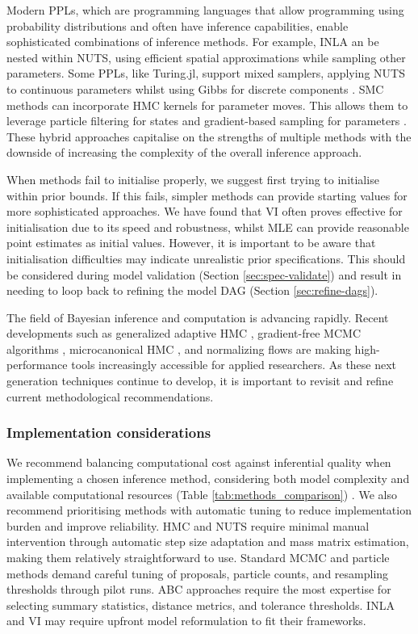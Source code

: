 \documentclass{article}
\begin{document}
Modern \ac{PPL}s, which are programming languages that allow programming using probability distributions and often have inference capabilities, enable sophisticated combinations of inference methods.
For example, \ac{INLA} an be nested within \ac{NUTS}, using efficient spatial approximations while sampling other parameters.
Some \ac{PPL}s, like Turing.jl, support mixed samplers, applying \ac{NUTS} to continuous parameters whilst using Gibbs for discrete components \citet{fjelde2025turing}.
\ac{SMC} methods can incorporate \ac{HMC} kernels for parameter moves.
This allows them to leverage particle filtering for states and gradient-based sampling for parameters \citet{buchholz2021adaptive, devlin2024no, rosato2024enhanced}.
These hybrid approaches capitalise on the strengths of multiple methods with the downside of increasing the complexity of the overall inference approach.

When methods fail to initialise properly, we suggest first trying to initialise within prior bounds.
If this fails, simpler methods can provide starting values for more sophisticated approaches.
We have found that \ac{VI} often proves effective for initialisation due to its speed and robustness, whilst \ac{MLE} can provide reasonable point estimates as initial values.
However, it is important to be aware that initialisation difficulties may indicate unrealistic prior specifications.
This should be considered during model validation (Section \ref{sec:spec-validate}) and result in needing to loop back to refining the model \ac{DAG} (Section \ref{sec:refine-dags}).

The field of Bayesian inference and computation is advancing rapidly. Recent developments such as generalized adaptive HMC \citep{bou2025within}, gradient-free MCMC algorithms \citep{bou2025no}, microcanonical HMC \citep{robnik2023microcanonical}, and normalizing flows \citep{papamakarios2021normalizing} are making high-performance tools increasingly accessible for applied researchers. As these next generation techniques continue to develop, it is important to revisit and refine current methodological recommendations.

\subsubsection{Implementation considerations}

We recommend balancing computational cost against inferential quality when implementing a chosen inference method, considering both model complexity and available computational resources (Table \ref{tab:methods_comparison}) \citep{funk2020choices}.
We also recommend prioritising methods with automatic tuning to reduce implementation burden and improve reliability.
\ac{HMC} and \ac{NUTS} require minimal manual intervention through automatic step size adaptation and mass matrix estimation, making them relatively straightforward to use.
Standard \ac{MCMC} and particle methods demand careful tuning of proposals, particle counts, and resampling thresholds through pilot runs.
\ac{ABC} approaches require the most expertise for selecting summary statistics, distance metrics, and tolerance thresholds.
\ac{INLA} and \ac{VI} may require upfront model reformulation to fit their frameworks.
\end{document}
